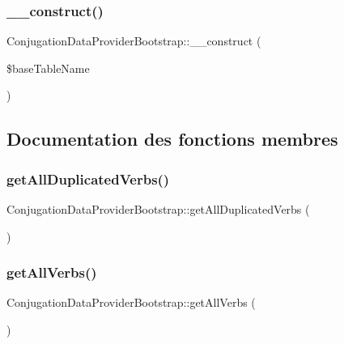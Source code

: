 \subsubsection{\texorpdfstring{\+\_\+\+\_\+construct()}{\_\_construct()}}
{\footnotesize\ttfamily Conjugation\+Data\+Provider\+Bootstrap\+::\+\_\+\+\_\+construct (\begin{DoxyParamCaption}\item[{}]{\$base\+Table\+Name }\end{DoxyParamCaption})}



\subsection{Documentation des fonctions membres}
\hypertarget{class_conjugation_data_provider_bootstrap_a0660df129657acbc695a05d6c27b4937}{}\label{class_conjugation_data_provider_bootstrap_a0660df129657acbc695a05d6c27b4937} 
\subsubsection{\texorpdfstring{get\+All\+Duplicated\+Verbs()}{getAllDuplicatedVerbs()}}
{\footnotesize\ttfamily Conjugation\+Data\+Provider\+Bootstrap\+::get\+All\+Duplicated\+Verbs (\begin{DoxyParamCaption}{ }\end{DoxyParamCaption})}

\hypertarget{class_conjugation_data_provider_bootstrap_a1fe64dbe28c3ed2c1c77797cb03703d8}{}\label{class_conjugation_data_provider_bootstrap_a1fe64dbe28c3ed2c1c77797cb03703d8} 
\subsubsection{\texorpdfstring{get\+All\+Verbs()}{getAllVerbs()}}
{\footnotesize\ttfamily Conjugation\+Data\+Provider\+Bootstrap\+::get\+All\+Verbs (\begin{DoxyParamCaption}{ }\end{DoxyParamCaption})}


